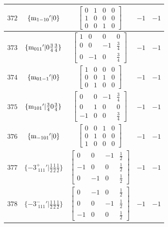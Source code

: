 \documentclass[fleqn,8pt]{jsarticle}
\begin{document}
\begin{longtable}{ccccc}
$ 372 $ & $ \{{\rm m}_{1-10}{}'|0\} $ & $ \begin{bmatrix} 0 & 1 & 0 & 0 \\ 1 & 0 & 0 & 0 \\ 0 & 0 & 1 & 0 \end{bmatrix} $ & $ -1 $ & $ -1 $ \\ \hline
$ 373 $ & $ \{{\rm m}_{011}{}'|0 \frac{3}{4} \frac{3}{4}\} $ & $ \begin{bmatrix} 1 & 0 & 0 & 0 \\ 0 & 0 & -1 & \frac{3}{4} \\ 0 & -1 & 0 & \frac{3}{4} \end{bmatrix} $ & $ -1 $ & $ -1 $ \\ \hline
$ 374 $ & $ \{{\rm m}_{01-1}{}'|0\} $ & $ \begin{bmatrix} 1 & 0 & 0 & 0 \\ 0 & 0 & 1 & 0 \\ 0 & 1 & 0 & 0 \end{bmatrix} $ & $ -1 $ & $ -1 $ \\ \hline
$ 375 $ & $ \{{\rm m}_{101}{}'|\frac{3}{4} 0 \frac{3}{4}\} $ & $ \begin{bmatrix} 0 & 0 & -1 & \frac{3}{4} \\ 0 & 1 & 0 & 0 \\ -1 & 0 & 0 & \frac{3}{4} \end{bmatrix} $ & $ -1 $ & $ -1 $ \\ \hline
$ 376 $ & $ \{{\rm m}_{-101}{}'|0\} $ & $ \begin{bmatrix} 0 & 0 & 1 & 0 \\ 0 & 1 & 0 & 0 \\ 1 & 0 & 0 & 0 \end{bmatrix} $ & $ -1 $ & $ -1 $ \\ \hline
$ 377 $ & $ \{-3^{+}_{\,\,111}{}'|\frac{1}{2} \frac{1}{2} \frac{1}{2}\} $ & $ \begin{bmatrix} 0 & 0 & -1 & \frac{1}{2} \\ -1 & 0 & 0 & \frac{1}{2} \\ 0 & -1 & 0 & \frac{1}{2} \end{bmatrix} $ & $ -1 $ & $ -1 $ \\ \hline
$ 378 $ & $ \{-3^{-}_{\,\,111}{}'|\frac{1}{2} \frac{1}{2} \frac{1}{2}\} $ & $ \begin{bmatrix} 0 & -1 & 0 & \frac{1}{2} \\ 0 & 0 & -1 & \frac{1}{2} \\ -1 & 0 & 0 & \frac{1}{2} \end{bmatrix} $ & $ -1 $ & $ -1 $ \\ \hline

\end{longtable}
\end{document}
